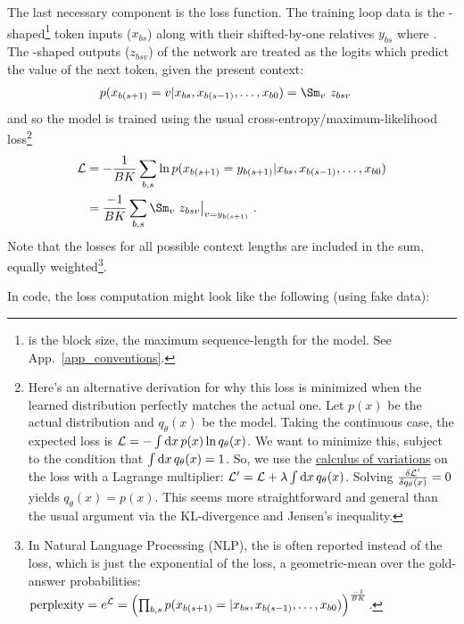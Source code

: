 The last necessary component is the loss function. The training loop data is the
-shaped\footnote{ is the block size, the maximum sequence-length for
	the model. See App.~\ref{app_conventions}.}  token inputs ($ x _{ bs } $) along with their shifted-by-one relatives $ y
		_{ bs }$ where .  The -shaped
outputs ($ z _{ bsv } $)  of the  network are treated as the logits which
predict the value of the next token, given the present context:
\begin{align}
	p(x _{ b (s+1) }=v| x _{ b s }, x _{ b (s-1) }, \ldots, x _{ b 0 }) & = \Sm _{ v }\ z _{ bsv
		}\label{eq_transformer_conditional_prob}
\end{align}
and so the model is trained using the usual cross-entropy/maximum-likelihood loss\footnote{Here's an
    alternative derivation for why this loss is minimized when the learned distribution perfectly
    matches the actual one. Let $ p(x) $ be the actual distribution and $ q _{ \theta }(x) $ be the
    model. Taking the continuous case, the expected loss is $ \mathcal{L} = - \int {\rm d} x\, p(x)\ln q _{
    \theta}(x) $. We want to minimize this, subject to the condition that $ \int {\rm d} x\, q _{ \theta
    }(x) =1 $. So, we use the \href{https://en.wikipedia.org/wiki/Calculus_of_variations}{calculus
    of variations} on the loss with a Lagrange multiplier: $ \mathcal{L}' = \mathcal{L} + \lambda \int {\rm d} x\, q
_{ \theta }(x) $. Solving  $ \frac{ \delta \mathcal{L}' }{ \delta q _{ \theta }(x) }=0 $ yields $ q _{
\theta }(x) = p(x) $. This seems more straightforward and general than the usual argument via the
KL-divergence and Jensen's inequality. }
\begin{align}
	\Lcal & = -\frac{ 1 }{ BK }\sum _{ b,s }\ln p(x _{ b (s+1) }=y _{ b(s+1) }| x _{ b s }, x _{ b (s-1) },
	\ldots, x _{ b 0 })\nn
	      & = \frac{- 1 }{ BK }\sum _{ b,s }\Sm _{ v }\ z _{ bsv}\big| _{ v=y _{ b(s+1) } } \ .
\end{align}
Note that the losses for all possible context lengths are included in the sum, equally
weighted\footnote{In Natural Language Processing (NLP), the  is often reported
    instead of the loss, which is just the exponential of the loss, a geometric-mean over the
    gold-answer probabilities: $ {\rm perplexity} = e^{ \mathcal{L} } =\left (\prod _{ b, s }p(x _{ b
        (s+1) }=| x _{ b s }, x _{ b (s-1) }, \ldots, x _{ b 0 })\right ) ^{ \frac{ -1 }{ BK } }$.}.

In 
code, the loss computation might look like the following (using fake data):


